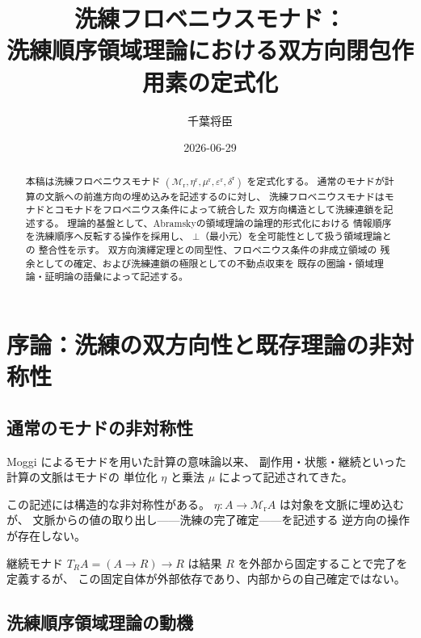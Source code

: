 \documentclass[11pt,a4paper]{article}
\theoremstyle{definition}
\newcommand{\Mr}{\mathcal{M}_{\mathrm{r}}}
\newcommand{\etar}{\eta^{\mathrm{r}}}
\newcommand{\mur}{\mu^{\mathrm{r}}}
\newcommand{\epsr}{\varepsilon^{\mathrm{r}}}
\newcommand{\deltar}{\delta^{\mathrm{r}}}
\begin{document}
\title{洗練フロベニウスモナド：\\
洗練順序領域理論における双方向閉包作用素の定式化}
\author{千葉将臣}
\date{2026-06-29}
\maketitle

\begin{abstract}
本稿は洗練フロベニウスモナド $(\Mr, \etar, \mur, \epsr, \deltar)$ を定式化する。
通常のモナドが計算の文脈への前進方向の埋め込みを記述するのに対し、
洗練フロベニウスモナドはモナドとコモナドをフロベニウス条件によって統合した
双方向構造として洗練連鎖を記述する。
理論的基盤として、Abramskyの領域理論の論理的形式化における
情報順序を洗練順序へ反転する操作を採用し、
$\bot$（最小元）を全可能性として扱う領域理論との
整合性を示す。
双方向演繹定理との同型性、フロベニウス条件の非成立領域の
残余としての確定、および洗練連鎖の極限としての不動点収束を
既存の圏論・領域理論・証明論の語彙によって記述する。
\end{abstract}

\tableofcontents
\newpage

\section{序論：洗練の双方向性と既存理論の非対称性}

\subsection{通常のモナドの非対称性}

Moggi \cite{Moggi1991} によるモナドを用いた計算の意味論以来、
副作用・状態・継続といった計算の文脈はモナドの
単位化 $\eta$ と乗法 $\mu$ によって記述されてきた。

この記述には構造的な非対称性がある。
$\eta: A \to \Mr A$ は対象を文脈に埋め込むが、
文脈からの値の取り出し——洗練の完了確定——を記述する
逆方向の操作が存在しない。

継続モナド $T_R A = (A \to R) \to R$
は結果 $R$ を外部から固定することで完了を定義するが、
この固定自体が外部依存であり、内部からの自己確定ではない。

\subsection{洗練順序領域理論の動機}
\end{document}
